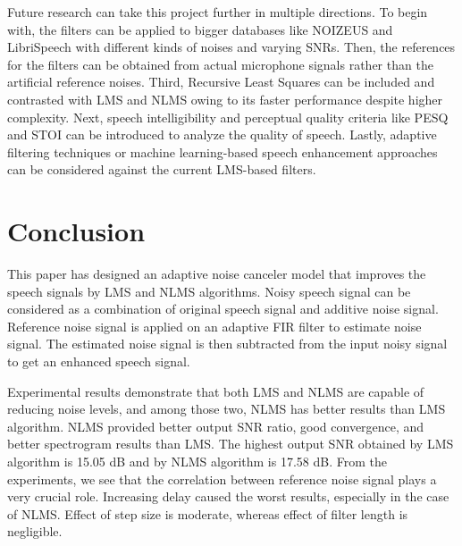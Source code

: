\documentclass[12pt]{article}
\begin{document}
Future research can take this project further in multiple directions. To begin with, the filters can be applied to bigger databases like NOIZEUS and LibriSpeech with different kinds of noises and varying SNRs. Then, the references for the filters can be obtained from actual microphone signals rather than the artificial reference noises. Third, Recursive Least Squares can be included and contrasted with LMS and NLMS owing to its faster performance despite higher complexity. Next, speech intelligibility and perceptual quality criteria like PESQ and STOI can be introduced to analyze the quality of speech. Lastly, adaptive filtering techniques or machine learning-based speech enhancement approaches can be considered against the current LMS-based filters.

\section{Conclusion}


This paper has designed an adaptive noise canceler model that improves the speech signals by LMS and NLMS algorithms. Noisy speech signal can be considered as a combination of original speech signal and additive noise signal. Reference noise signal is applied on an adaptive FIR filter to estimate noise signal. The estimated noise signal is then subtracted from the input noisy signal to get an enhanced speech signal.

Experimental results demonstrate that both LMS and NLMS are capable of reducing noise levels, and among those two, NLMS has better results than LMS algorithm. NLMS provided better output SNR ratio, good convergence, and better spectrogram results than LMS. The highest output SNR obtained by LMS algorithm is 15.05 dB and by NLMS algorithm is 17.58 dB. From the experiments, we see that the correlation between reference noise signal plays a very crucial role. Increasing delay caused the worst results, especially in the case of NLMS. Effect of step size is moderate, whereas effect of filter length is negligible.
\end{document}
